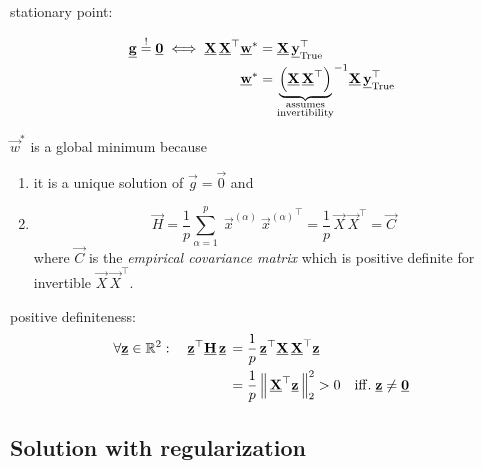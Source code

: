 \begin{frame}

stationary point:

\begin{align}
\underline{\mathbf{g}} \stackrel{\mathrm{!}}{=} \underline{\mathbf{0}} \iff \underline{\mathbf{X}} \, \underline{\mathbf{X}}^\top \underline{\mathbf{w}}^*  &= \underline{\mathbf{X}}\, \underline{\mathbf{y}}_{\text{True}}^\top\\
\underline{\mathbf{w}}^* &=
{
\underbrace{
\left(
\underline{\mathbf{X}} \, \underline{\mathbf{X}}^\top
\right)
}_{\substack{\text{assumes}\\ \text{invertibility}}} 
}^{-1} \underline{\mathbf{X}}\, \underline{\mathbf{y}}_{\text{True}}^\top
\end{align}

$\vec w^*$ is a global minimum because
\pause
\begin{enumerate}[1.]
\item it is a unique solution of $\vec g = \vec 0$ and
\item 
\begin{equation}
\vec H 
= \frac{1}{p} \sum_{\alpha=1}^{p} \;
\vec x^{(\alpha)}~{\vec x^{(\alpha)}}^\top 
= \frac{1}{p} \, \vec X \, \vec X^\top = \vec C
\end{equation}
where $\vec C$ is the \emph{empirical covariance matrix} which is positive definite for invertible $\vec X\, \vec X^\top$.
\end{enumerate}

\pause
positive definiteness:
\begin{align}
\forall \underline{\mathbf{z}} \in \mathbb{R}^2: \quad \underline{\mathbf{z}}^\top \underline{\mathbf{H}}\, \underline{\mathbf{z}} 
\, &= \frac{1}{p} \, \underline{\mathbf{z}}^\top \underline{\mathbf{X}} \, \underline{\mathbf{X}}^\top \underline{\mathbf{z}}\\
\, &= \frac{1}{p} \, \Big \lVert \, \underline{\mathbf{X}}^\top \underline{\mathbf{z}} \, \Big \rVert_2^2 > 0 \quad \mathrm{iff.} \; \underline{\mathbf{z}} \ne \underline{\mathbf{0}}
\end{align}

\end{frame}

\subsection{Solution with regularization}

